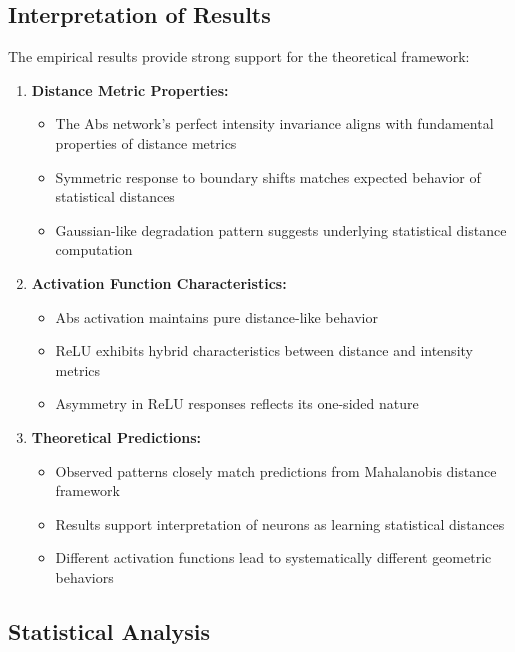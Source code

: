 \subsection{Interpretation of Results}

The empirical results provide strong support for the theoretical framework:

\begin{enumerate}
    \item \textbf{Distance Metric Properties:}
        \begin{itemize}
            \item The Abs network's perfect intensity invariance aligns with fundamental properties of distance metrics
            \item Symmetric response to boundary shifts matches expected behavior of statistical distances
            \item Gaussian-like degradation pattern suggests underlying statistical distance computation
        \end{itemize}
    
    \item \textbf{Activation Function Characteristics:}
        \begin{itemize}
            \item Abs activation maintains pure distance-like behavior
            \item ReLU exhibits hybrid characteristics between distance and intensity metrics
            \item Asymmetry in ReLU responses reflects its one-sided nature
        \end{itemize}
    
    \item \textbf{Theoretical Predictions:}
        \begin{itemize}
            \item Observed patterns closely match predictions from Mahalanobis distance framework
            \item Results support interpretation of neurons as learning statistical distances
            \item Different activation functions lead to systematically different geometric behaviors
        \end{itemize}
\end{enumerate}

\subsection{Statistical Analysis}

